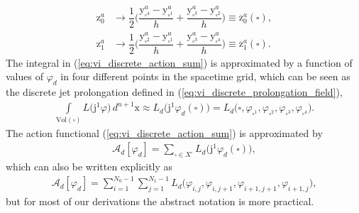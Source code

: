 \documentclass[12pt,a4paper,reqno]{article}
\begin{document}
\begin{align}
\label{eq:vi_discrete_derivative_0}
{\ensuremath{{\ensuremath{\mathrm{{z}}}}}}^{a}_{0} &\rightarrow \dfrac{1}{2} \bigg( \dfrac{{\ensuremath{{\ensuremath{\mathrm{{y}}}}}}_{\square^4}^{a} - {\ensuremath{{\ensuremath{\mathrm{{y}}}}}}_{\square^1}^{a}}{h} + \dfrac{{\ensuremath{{\ensuremath{\mathrm{{y}}}}}}_{\square^3}^{a} - {\ensuremath{{\ensuremath{\mathrm{{y}}}}}}_{\square^2}^{a}}{h} \bigg) \equiv \overline{\ensuremath{{\ensuremath{\mathrm{{z}}}}}}_{0}^{a} (\square) , \\
\label{eq:vi_discrete_derivative_1}
{\ensuremath{{\ensuremath{\mathrm{{z}}}}}}^{a}_{1} &\rightarrow \dfrac{1}{2} \bigg( \dfrac{{\ensuremath{{\ensuremath{\mathrm{{y}}}}}}_{\square^2}^{a} - {\ensuremath{{\ensuremath{\mathrm{{y}}}}}}_{\square^1}^{a}}{h} + \dfrac{{\ensuremath{{\ensuremath{\mathrm{{y}}}}}}_{\square^3}^{a} - {\ensuremath{{\ensuremath{\mathrm{{y}}}}}}_{\square^4}^{a}}{h} \bigg) \equiv \overline{\ensuremath{{\ensuremath{\mathrm{{z}}}}}}_{1}^{a} (\square) .
\end{align}
The integral in (\ref{eq:vi_discrete_action_sum}) is approximated by a function of values of ${\ensuremath{\varphi}}_{d}$ in four different points in the spacetime grid, which can be seen as the discrete jet prolongation defined in (\ref{eq:vi_discrete_prolongation_field}),
\begin{align}\label{eq:vi_discrete_replace_lagrangian}
\int \limits_{\text{Vol}(\square)} L \big( {\ensuremath{\mathrm{j}}}^{1} {\ensuremath{\varphi}} \big) \, d^{n+1} {\ensuremath{{\ensuremath{\mathrm{{x}}}}}}
\approx
L_{d} \big( {\ensuremath{\mathrm{j}}}^{1} {\ensuremath{\varphi}}_{d} (\square) \big) =
L_{d} \big( \square, {\ensuremath{\varphi}}_{\square^1}, {\ensuremath{\varphi}}_{\square^2}, {\ensuremath{\varphi}}_{\square^3}, {\ensuremath{\varphi}}_{\square^4} \big) .
\end{align}
The action functional (\ref{eq:vi_discrete_action_sum}) is approximated by
\begin{align}\label{eq:vi_discrete_replace_action}
\mathcal{A}_{d} [{\ensuremath{\varphi}}_{d}] = \sum \limits_{\square \in X^{\square}} L_{d} \big( {\ensuremath{\mathrm{j}}}^{1} {\ensuremath{\varphi}}_{d} (\square) \big) ,
\end{align}
which can also be written explicitly as
\begin{align}
\mathcal{A}_{d} [{\ensuremath{\varphi}}_{d}] = \sum \limits_{i=1}^{N_{0}-1} \sum \limits_{j=1}^{N_{1}-1} L_{d} \big( {\ensuremath{\varphi}}_{i,j}, {\ensuremath{\varphi}}_{i,j+1}, {\ensuremath{\varphi}}_{i+1,j+1}, {\ensuremath{\varphi}}_{i+1,j} \big) ,
\end{align}
but for most of our derivations the abstract notation is more practical.
\end{document}
